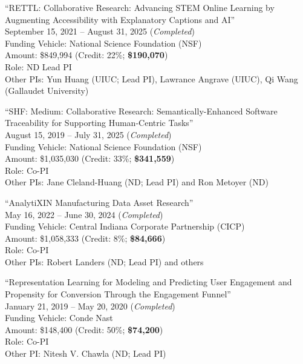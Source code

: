 \documentclass[10pt]{article}
\newenvironment{myindentpar}[1]%
{\begin{list}{}%
         {\setlength{\leftmargin}{#1}}%
         \item[]%
}
{\end{list}}
\newcounter{list}
\begin{document}
\begin{myindentpar}{0.75cm}
\hspace{-0.75cm}``RETTL: Collaborative Research: Advancing STEM Online Learning by Augmenting Accessibility with Explanatory Captions and AI'' \\
September 15, 2021 -- August 31, 2025 (\emph{Completed}) \\
Funding Vehicle: National Science Foundation (NSF) \\
Amount: \$849,994 (Credit: 22\%; \textbf{\$190,070}) \\
Role: {ND Lead PI} \\
Other PIs: Yun Huang (UIUC; Lead PI), Lawrance Angrave (UIUC), Qi Wang (Gallaudet University)

\hspace{-0.75cm}``SHF: Medium: Collaborative Research: Semantically-Enhanced Software Traceability for Supporting Human-Centric Tasks'' \\
August 15, 2019 -- July 31, 2025 (\emph{Completed}) \\
Funding Vehicle: National Science Foundation (NSF) \\
Amount: \$1,035,030 (Credit: 33\%; \textbf{\$341,559}) \\
Role: {Co-PI} \\
Other PIs: Jane Cleland-Huang (ND; Lead PI) and Ron Metoyer (ND)

\hspace{-0.75cm}``AnalytiXIN Manufacturing Data Asset Research'' \\
May 16, 2022 -- June 30, 2024 (\emph{Completed}) \\
Funding Vehicle: Central Indiana Corporate Partnership (CICP) \\
Amount: \$1,058,333 (Credit: 8\%; \textbf{\$84,666}) \\
Role: {Co-PI} \\
Other PIs: Robert Landers (ND; Lead PI) and others

\hspace{-0.75cm}``Representation Learning for Modeling and Predicting User Engagement and Propensity for Conversion Through the Engagement Funnel'' \\
January 21, 2019 -- May 20, 2020 (\emph{Completed}) \\
Funding Vehicle: Conde Nast \\
Amount: \$148,400 (Credit: 50\%; \textbf{\$74,200}) \\
Role: {Co-PI} \\
Other PI: Nitesh V. Chawla (ND; Lead PI)


\end{myindentpar}
\end{document}
